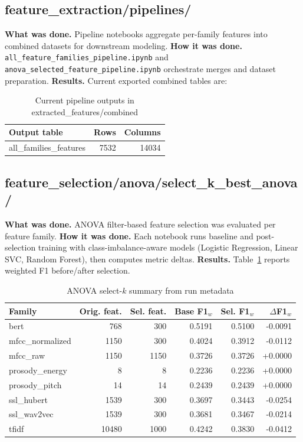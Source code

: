 \subsection{feature\_extraction/pipelines/}
\textbf{What was done.} Pipeline notebooks aggregate per-family features into combined datasets for downstream modeling.
\textbf{How it was done.} \texttt{all\_feature\_families\_pipeline.ipynb} and \texttt{anova\_selected\_feature\_pipeline.ipynb} orchestrate merges and dataset preparation.
\textbf{Results.} Current exported combined tables are:
\begin{table}[h]
\centering
\caption{Current pipeline outputs in extracted\_features/combined}
\begin{tabular}{lrr}
\hline
Output table & Rows & Columns \\
\hline
all\_families\_features & 7532 & 14034 \\
\hline
\end{tabular}
\end{table}
\subsection{feature\_selection/anova/select\_k\_best\_anova/}
\textbf{What was done.} ANOVA filter-based feature selection was evaluated per feature family.
\textbf{How it was done.} Each notebook runs baseline and post-selection training with class-imbalance-aware models (Logistic Regression, Linear SVC, Random Forest), then computes metric deltas.
\textbf{Results.} Table~\ref{tab:anova_results} reports weighted F1 before/after selection.
\begin{table}[h]
\centering
\caption{ANOVA select-$k$ summary from run metadata}
\label{tab:anova_results}
\begin{tabular}{lrrrrr}
\hline
Family & Orig. feat. & Sel. feat. & Base F1$_w$ & Sel. F1$_w$ & $\Delta$F1$_w$ \\
\hline
bert & 768 & 300 & 0.5191 & 0.5100 & -0.0091 \\
mfcc\_normalized & 1150 & 300 & 0.4024 & 0.3912 & -0.0112 \\
mfcc\_raw & 1150 & 1150 & 0.3726 & 0.3726 & +0.0000 \\
prosody\_energy & 8 & 8 & 0.2236 & 0.2236 & +0.0000 \\
prosody\_pitch & 14 & 14 & 0.2439 & 0.2439 & +0.0000 \\
ssl\_hubert & 1539 & 300 & 0.3697 & 0.3443 & -0.0254 \\
ssl\_wav2vec & 1539 & 300 & 0.3681 & 0.3467 & -0.0214 \\
tfidf & 10480 & 1000 & 0.4242 & 0.3830 & -0.0412 \\
\hline
\end{tabular}
\end{table}
